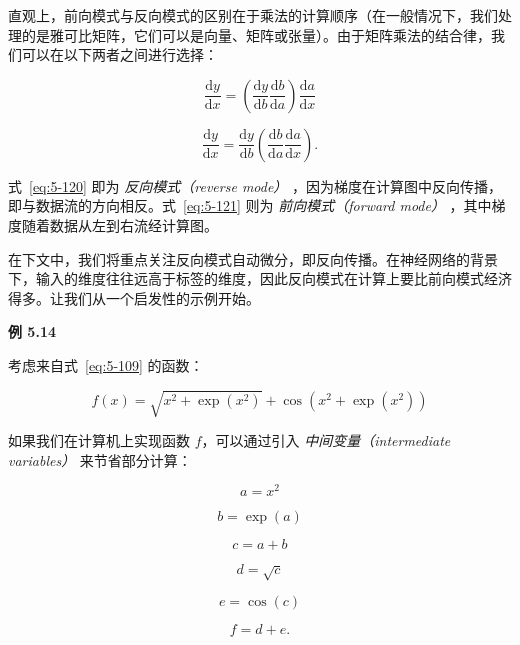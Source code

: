 直观上，前向模式与反向模式的区别在于乘法的计算顺序（在一般情况下，我们处理的是雅可比矩阵，它们可以是向量、矩阵或张量）。由于矩阵乘法的结合律，我们可以在以下两者之间进行选择：

\begin{equation}
\frac{\mathrm{d}y}{\mathrm{d}x} = \left( \frac{\mathrm{d}y}{\mathrm{d}b} \frac{\mathrm{d}b}{\mathrm{d}a} \right) \frac{\mathrm{d}a}{\mathrm{d}x}
\tag{5.120}\label{eq:5-120}
\end{equation}

\begin{equation}
\frac{\mathrm{d}y}{\mathrm{d}x} = \frac{\mathrm{d}y}{\mathrm{d}b} \left( \frac{\mathrm{d}b}{\mathrm{d}a} \frac{\mathrm{d}a}{\mathrm{d}x} \right) .
\tag{5.121}\label{eq:5-121}
\end{equation}

式~\eqref{eq:5-120} 即为 \emph{反向模式（reverse mode）} ，因为梯度在计算图中反向传播，即与数据流的方向相反。式~\eqref{eq:5-121} 则为 \emph{前向模式（forward mode）} ，其中梯度随着数据从左到右流经计算图。

在下文中，我们将重点关注反向模式自动微分，即反向传播。在神经网络的背景下，输入的维度往往远高于标签的维度，因此反向模式在计算上要比前向模式经济得多。让我们从一个启发性的示例开始。

\begin{notebox}
\textbf{例 5.14}
\end{notebox}

\begin{notebox}
考虑来自式~\eqref{eq:5-109} 的函数：

\begin{equation}
f(x) = \sqrt{x^2 + \exp(x^2)} + \cos(x^2 + \exp(x^2))
\tag{5.122}\label{eq:5-122}
\end{equation}

如果我们在计算机上实现函数 $ f $，可以通过引入 \emph{中间变量（intermediate variables）} 来节省部分计算：

\begin{equation}
a = x^2
\tag{5.123}\label{eq:5-123}
\end{equation}

\begin{equation}
b = \exp(a)
\tag{5.124}\label{eq:5-124}
\end{equation}

\begin{equation}
c = a + b
\tag{5.125}\label{eq:5-125}
\end{equation}

\begin{equation}
d = \sqrt{c}
\tag{5.126}\label{eq:5-126}
\end{equation}

\begin{equation}
e = \cos(c)
\tag{5.127}\label{eq:5-127}
\end{equation}

\begin{equation}
f = d + e .
\tag{5.128}\label{eq:5-128}
\end{equation}
\end{notebox}

